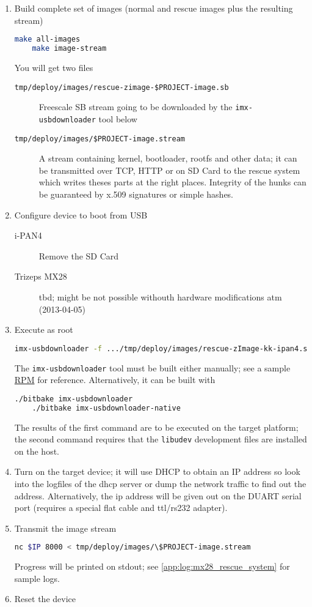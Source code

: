 \begin{enumerate}
\item Build complete set of images (normal and rescue images plus the
  resulting stream)
  \begin{lstlisting}[language=sh]
    make all-images
    make image-stream
  \end{lstlisting}
  You will get two files
  \begin{description}
  \item [\texttt{tmp/deploy/images/rescue-zimage-\$PROJECT-image.sb}]
    Freescale SB stream going to be downloaded by the
    \texttt{imx-usbdownloader} tool below
  \item [\texttt{tmp/deploy/images/\$PROJECT-image.stream}] A stream
    containing kernel, bootloader, rootfs and other data; it can be
    transmitted over TCP, HTTP or on SD Card to the rescue system
    which writes theses parts at the right places.  Integrity of the
    hunks can be guaranteed by x.509 signatures or simple hashes.
  \end{description}
\item Configure device to boot from USB
  \begin{description}
  \item[i-PAN4] Remove the SD Card
  \item[Trizeps MX28] tbd; might be not possible withouth hardware
    modifications atm (2013-04-05)
  \end{description}
\item Execute as root
  \begin{lstlisting}[language=sh]
    imx-usbdownloader -f .../tmp/deploy/images/rescue-zImage-kk-ipan4.sb
  \end{lstlisting}

  The \texttt{imx-usbdownloader} tool must be built either manually;
  see a sample
  \href{http://www.sigma-chemnitz.de/elito/sources/imx-usbdownloader-0.0.2-1.fc17x.src.rpm}{RPM}
  for reference.  Alternatively, it can be built with
  \begin{lstlisting}[language=sh]
    ./bitbake imx-usbdownloader
    ./bitbake imx-usbdownloader-native
  \end{lstlisting}
  The results of the first command are to be executed on the target
  platform; the second command requires that the \texttt{libudev}
  development files are installed on the host.
\item Turn on the target device; it will use DHCP to obtain an IP
  address so look into the logfiles of the dhcp server or dump the
  network traffic to find out the address.  Alternatively, the ip
  address will be given out on the DUART serial port (requires a
  special flat cable and ttl/rs232 adapter).
\item Transmit the image stream
  \begin{lstlisting}[language=sh]
    nc $IP 8000 < tmp/deploy/images/\$PROJECT-image.stream
  \end{lstlisting}
  Progress will be printed on stdout; see
  \ref{app:log:mx28_rescue_system} for sample logs.
\item Reset the device
\end{enumerate}

